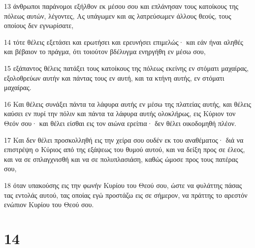 \par 13 άνθρωποι παράνομοι εξήλθον εκ μέσου σου και επλάνησαν τους κατοίκους της πόλεως αυτών, λέγοντες, Ας υπάγωμεν και ας λατρεύσωμεν άλλους θεούς, τους οποίους δεν εγνωρίσατε,
\par 14 τότε θέλεις εξετάσει και ερωτήσει και ερευνήσει επιμελώς· και εάν ήναι αληθές και βέβαιον το πράγμα, ότι τοιούτον βδέλυγμα ενηργήθη εν μέσω σου,
\par 15 εξάπαντος θέλεις πατάξει τους κατοίκους της πόλεως εκείνης εν στόματι μαχαίρας, εξολοθρεύων αυτήν και πάντας τους εν αυτή, και τα κτήνη αυτής, εν στόματι μαχαίρας.
\par 16 Και θέλεις συνάξει πάντα τα λάφυρα αυτής εν μέσω της πλατείας αυτής, και θέλεις καύσει εν πυρί την πόλιν και πάντα τα λάφυρα αυτής ολοκλήρως, εις Κύριον τον Θεόν σου· και θέλει είσθαι εις τον αιώνα ερείπια· δεν θέλει οικοδομηθή πλέον.
\par 17 Και δεν θέλει προσκολληθή εις την χείρα σου ουδέν εκ του αναθέματος· διά να επιστρέψη ο Κύριος από της εξάψεως του θυμού αυτού, και να δείξη προς σε έλεος, και να σε σπλαγχνισθή και να σε πολυπλασιάση, καθώς ώμοσε προς τους πατέρας σου,
\par 18 όταν υπακούσης εις την φωνήν Κυρίου του Θεού σου, ώστε να φυλάττης πάσας τας εντολάς αυτού, τας οποίας εγώ προστάζω εις σε σήμερον, να πράττης το αρεστόν ενώπιον Κυρίου του Θεού σου.

\chapter{14}

